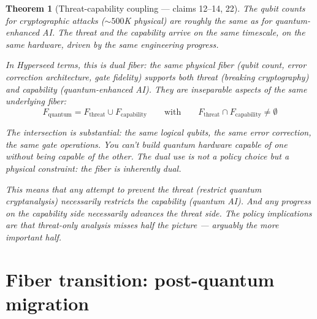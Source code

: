 \documentclass[11pt,a4paper]{article}
\newtheorem{theorem}[definition]{Theorem}
\begin{document}
\begin{theorem}[Threat-capability coupling --- claims 12--14, 22]
\label{thm:dual}
The qubit counts for cryptographic attacks (${\sim}500$K physical)
are roughly the same as for quantum-enhanced AI. The threat and the
capability arrive on the same timescale, on the same hardware, driven
by the same engineering progress.

In Hyperseed terms, this is \emph{dual fiber}: the same physical fiber
(qubit count, error correction architecture, gate fidelity) supports
both threat (breaking cryptography) and capability (quantum-enhanced
AI). They are inseparable aspects of the same underlying fiber:
\[
  F_{\text{quantum}} = F_{\text{threat}} \cup F_{\text{capability}}
  \qquad \text{with} \qquad
  F_{\text{threat}} \cap F_{\text{capability}} \neq \emptyset
\]

The intersection is substantial: the same logical qubits, the same
error correction, the same gate operations. You can't build quantum
hardware capable of one without being capable of the other. The dual
use is not a policy choice but a physical constraint: the fiber is
inherently dual.

This means that any attempt to prevent the threat (restrict quantum
cryptanalysis) necessarily restricts the capability (quantum AI).
And any progress on the capability side necessarily advances the
threat side. The policy implications are that threat-only analysis
misses half the picture --- arguably the more important half.
\end{theorem}

\section{Fiber transition: post-quantum migration}
\label{sec:transition}
\end{document}
